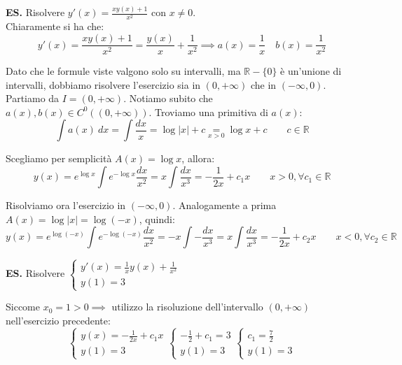 \documentclass{article}
\begin{document}
\noindent\textbf{ES.} Risolvere $y'(x) = \frac{xy(x) + 1}{x^2}$ con $x \neq 0$.\\
Chiaramente si ha che:
\begin{equation*}
    y'(x) = \frac{xy(x) + 1}{x^2} = \frac{y(x)}{x} + \frac{1}{x^2} \implies a(x) = \frac{1}{x} \quad b(x) = \frac{1}{x^2}
\end{equation*}

\noindent Dato che le formule viste valgono solo su intervalli, ma $\mathbb{R} - \{0\}$ è un'unione di intervalli, dobbiamo risolvere l'esercizio sia in $(0, +\infty)$ che in $(-\infty, 0)$. Partiamo da $I = (0, +\infty)$. Notiamo subito che $a(x), b(x) \in C^0((0, +\infty))$. Troviamo una primitiva di $a(x)$:
\begin{equation*}
    \int a(x) \ dx = \int \frac{dx}{x} = \log|x| + c \underset{x > 0}{=} \log x + c \qquad c \in \mathbb{R}
\end{equation*}

\noindent Scegliamo per semplicità $A(x) = \log x$, allora:
\begin{equation*}
    y(x) = e^{\log x} \int e^{-\log x} \frac{dx}{x^2} = x \int \frac{dx}{x^3} = - \frac{1}{2x} + c_1x \qquad x > 0, \forall c_1 \in \mathbb{R}
\end{equation*}

\noindent Risolviamo ora l'esercizio in $(-\infty, 0)$. Analogamente a prima $A(x) = \log|x| = \log(-x)$, quindi:
\begin{equation*}
    y(x) = e^{\log(-x)} \int e^{-\log(-x)} \frac{dx}{x^2} = -x \int - \frac{dx}{x^3} = x \int \frac{dx}{x^3} = - \frac{1}{2x} + c_2x \qquad x < 0, \forall c_2 \in \mathbb{R}
\end{equation*}

\noindent\textbf{ES.} Risolvere $\begin{cases}
    y'(x) = \frac{1}{x} y(x) + \frac{1}{x^2} \\ 
    y(1) = 3
\end{cases}$

\noindent Siccome $x_0 = 1 > 0 \implies$ utilizzo la risoluzione dell'intervallo $(0, +\infty)$ nell'esercizio precedente:
\begin{equation*}
    \begin{cases}
        y(x) = -\frac{1}{2x} + c_1x \\
        y(1) = 3
    \end{cases}
    \begin{cases}
        -\frac{1}{2} + c_1 = 3 \\
        y(1) = 3
    \end{cases}
    \begin{cases}
        c_1 = \frac{7}{2} \\
        y(1) = 3
    \end{cases}
\end{equation*}
\end{document}
